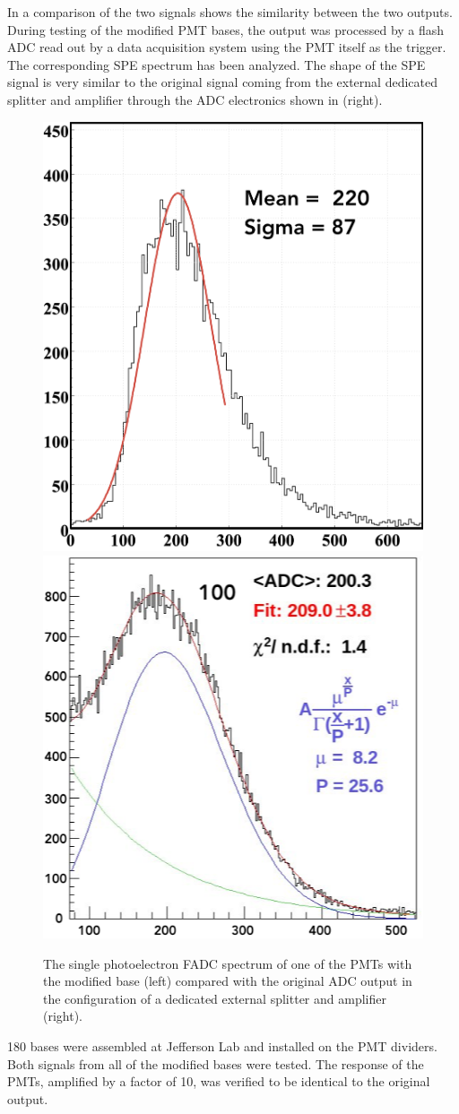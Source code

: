 In  a comparison of the two signals shows the similarity between the two outputs.
During testing of the modified PMT bases, the output was processed by a flash ADC read out by a data
acquisition system using the PMT itself as the trigger.
The corresponding SPE spectrum has been analyzed. The shape of the SPE signal is very similar to the original signal
coming from the external dedicated splitter and amplifier through the ADC electronics shown in  (right).

\begin{figure}
	\centering
	\includegraphics[width=0.47\columnwidth,height=0.75\columnwidth]{img/fadcOutput.png}
	\includegraphics[width=0.47\columnwidth,height=0.75\columnwidth]{img/cc_signal.png}
	\caption{The single photoelectron FADC spectrum of one of the PMTs with the modified base (left) compared with the original ADC output in the
            configuration of a dedicated external splitter and amplifier (right). }
	\label{fig:dividerTests}
\end{figure}

180 bases were assembled at Jefferson Lab and installed on the PMT dividers. Both signals from all of the modified
bases were tested. The response of the PMTs, amplified by a factor of 10, was verified to be identical to the original
output.


